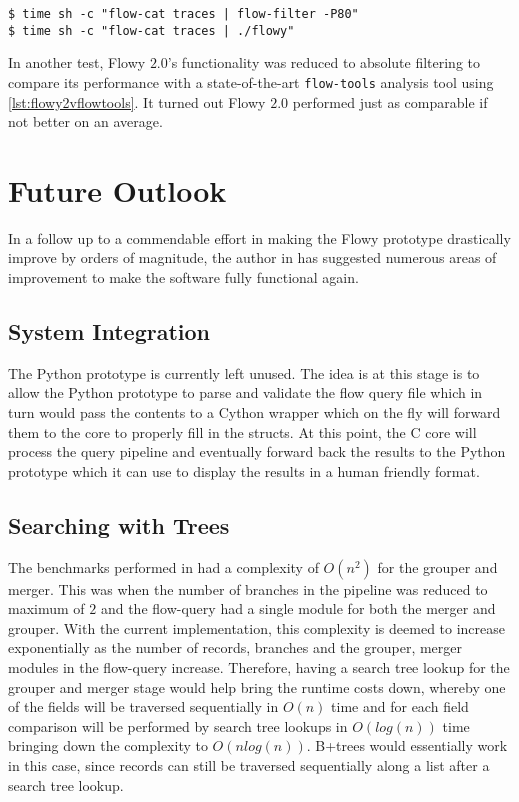 \begin{lstlisting}
$ time sh -c "flow-cat traces | flow-filter -P80"
$ time sh -c "flow-cat traces | ./flowy"
\end{lstlisting}

In another test, Flowy $2.0$'s functionality was reduced to absolute filtering  to compare its performance with a state-of-the-art \texttt{flow-tools} analysis tool using \ref{lst:flowy2vflowtools}. It turned out Flowy $2.0$ performed just as comparable if not better on an average.

\section{Future Outlook}\label{sec:flowy2-future}
In a follow up to a commendable effort in making the Flowy prototype drastically improve by orders of magnitude, the author in \cite{jschauer:thesis:2011} has suggested numerous areas of improvement to make the software fully functional again.

\subsection{System Integration}\label{subsec:system-integration}
The Python prototype is currently left unused. The idea is at this stage is to allow the Python prototype to parse and validate the flow query file which in turn would pass the contents to a Cython wrapper which on the fly will forward them to the core to properly fill in the structs. At this point, the C core will process the query pipeline and eventually forward back the results to the Python prototype which it can use to display the results in a human friendly format.

\subsection{Searching with Trees}\label{subsec:search-trees} 
The benchmarks performed in \cite{jschauer:thesis:2011} had a complexity of $O(n^2)$ for the grouper and merger. This was when the number of branches in the pipeline was reduced to maximum of $2$ and the flow-query had a single module for both the merger and grouper. With the current implementation, this complexity is deemed to increase exponentially as the number of records, branches and the grouper, merger modules in the flow-query increase. Therefore, having a search tree lookup for the grouper and merger stage would help bring the runtime costs down, whereby one of the fields will be traversed sequentially in $O(n)$ time and for each field comparison will be performed  by search tree lookups in $O(log(n))$ time bringing down the complexity to $O(nlog(n))$. B+trees would essentially work in this case, since records can still be traversed sequentially along a list after a search tree lookup. 

